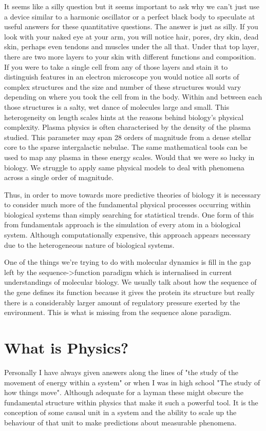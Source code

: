 It seems like a silly question but it seems important to ask why we can't just use a device similar to a harmonic oscillator or a perfect black body to speculate at useful answers for these quantitative questions. The answer is just as silly. If you look with your naked eye at your arm, you will notice hair, pores, dry skin, dead skin, perhaps even tendons and muscles under the all that. Under that top layer, there are two more layers to your skin with different functions and composition. If you were to take a single cell from any of those layers and stain it to distinguish features in an electron microscope you would notice all sorts of complex structures and the size and number of these structures would vary depending on where you took the cell from in the body. Within and between each those structures is a salty, wet dance of molecules large and small. This heterogeneity on length scales hints at the reasons behind biology's physical complexity. Plasma physics is often characterised by the density of the plasma studied. This parameter may span 28 orders of magnitude from a dense stellar core to the sparse intergalactic nebulae\cite{chen2018}. The same mathematical tools can be used to map any plasma in these energy scales. Would that we were so lucky in biology. We struggle to apply same physical models to deal with phenomena across a single order of magnitude.  

Thus, in order to move towards more predictive theories of biology it is necessary to consider much more of the fundamental physical processes occurring within biological systems than simply searching for statistical trends. One form of this from fundamentals approach is the simulation of every atom in a biological system. Although computationally expensive, this approach appears necessary due to the heterogeneous nature of biological systems. 

One of the things we're trying to do with molecular dynamics is fill in the gap left by the sequence->function paradigm which is internalised in current understandings of molecular biology. We usually talk about how the sequence of the gene defines its function because it gives the protein its structure but really there is a considerably larger amount of regulatory pressure exerted by the environment. This is what is missing from the sequence alone paradigm.

\section{What is Physics?}
Personally I have always given answers along the lines of "the study of the movement of energy within a system" or when I was in high school "The study of how things move". Although adequate for a layman these might obscure the fundamental structure within physics that make it such a powerful tool. It is the conception of some causal unit in a system and the ability to scale up the behaviour of that unit to make predictions about measurable phenomena.

